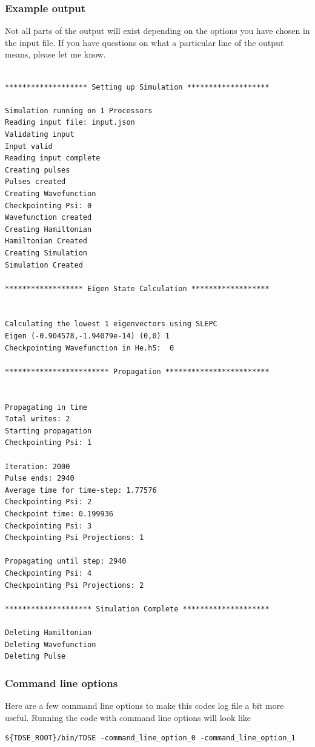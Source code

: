 \documentclass{article}
\begin{document}
\subsubsection{Example output}
\label{ssub:example_output}
Not all parts of the output will exist depending on the options you have chosen in the input file. If you have questions on what a particular line of the output means, please let me know.
\begin{verbatim}

******************* Setting up Simulation *******************

Simulation running on 1 Processors
Reading input file: input.json
Validating input
Input valid
Reading input complete
Creating pulses
Pulses created
Creating Wavefunction
Checkpointing Psi: 0
Wavefunction created
Creating Hamiltonian
Hamiltonian Created
Creating Simulation
Simulation Created

****************** Eigen State Calculation ******************


Calculating the lowest 1 eigenvectors using SLEPC
Eigen (-0.904578,-1.94079e-14) (0,0) 1
Checkpointing Wavefunction in He.h5:  0

************************ Propagation ************************


Propagating in time
Total writes: 2
Starting propagation
Checkpointing Psi: 1

Iteration: 2000
Pulse ends: 2940
Average time for time-step: 1.77576
Checkpointing Psi: 2
Checkpoint time: 0.199936
Checkpointing Psi: 3
Checkpointing Psi Projections: 1

Propagating until step: 2940
Checkpointing Psi: 4
Checkpointing Psi Projections: 2

******************** Simulation Complete ********************

Deleting Hamiltonian
Deleting Wavefunction
Deleting Pulse
\end{verbatim}
\newpage

\subsubsection{Command line options} %
\label{ssub:command_line_options}
Here are a few command line options to make this codes log file a bit more useful. Running the code with command line options will look like
\begin{verbatim}
${TDSE_ROOT}/bin/TDSE -command_line_option_0 -command_line_option_1
\end{verbatim}
\end{document}
